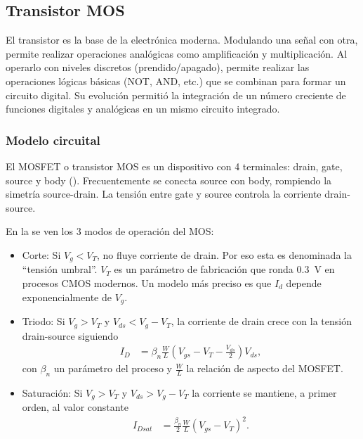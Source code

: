 \subsection{Transistor MOS}
El transistor es la base de la electrónica moderna.
Modulando una señal con otra, 
permite realizar operaciones analógicas como amplificación y multiplicación.
Al operarlo con niveles discretos (prendido/apagado),
permite realizar las operaciones lógicas básicas (NOT, AND, etc.) que
se combinan para formar un circuito digital.
Su evolución permitió la integración de un número creciente de funciones
digitales y analógicas en un mismo circuito integrado.
%
\subsubsection{Modelo circuital}
El MOSFET o transistor MOS es un dispositivo con 4 terminales:
drain, gate, source y body ().
Frecuentemente se conecta source con body, rompiendo la simetría source-drain.
La tensión entre gate y source controla la corriente drain-source.

En la  se ven los 3 modos de operación del MOS:
\begin{itemize}
    \item Corte: Si $V_g<V_T$, no fluye corriente de drain.
        Por eso esta es denominada la ``tensión umbral''.
        $V_T$ es un parámetro de fabricación que ronda \SI{.3}{\volt} en procesos CMOS
        modernos.
        Un modelo más preciso es que $I_d$ depende exponencialmente de $V_g$.
    \item Triodo: Si $V_g>V_T$ y $V_{ds}<V_g-V_T$, la corriente de drain crece con la
        tensión drain-source siguiendo
        \begin{align*}
            I_D&=\beta_n\frac WL(V_{gs}-V_T-\frac{V_{ds}}2)V_{ds},
        \end{align*}
        con $\beta_n$ un parámetro del proceso y $\frac WL$ la relación de
        aspecto del MOSFET.
    \item Saturación: Si $V_g>V_T$ y $V_{ds}>V_g-V_T$ la corriente se mantiene, a primer
        orden, al valor constante
        \begin{align*}
            I_{Dsat}&=\frac{\beta_n}2\frac WL(V_{gs}-V_T)^2.
        \end{align*}
\end{itemize}
%
